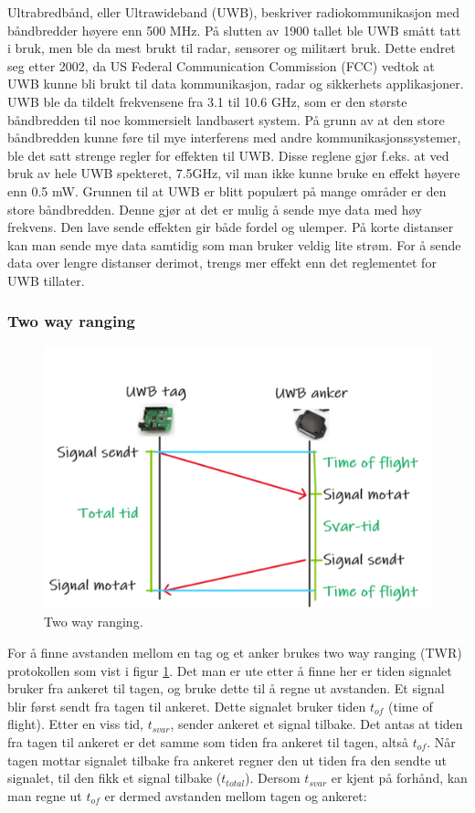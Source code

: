 Ultrabredbånd, eller Ultrawideband (UWB), beskriver radiokommunikasjon med båndbredder høyere enn 500 MHz. 
På slutten av 1900 tallet ble UWB smått tatt i bruk, men ble da mest brukt til radar, sensorer og militært bruk. 
Dette endret seg etter 2002, da US Federal Communication Commission (FCC) vedtok at UWB kunne bli brukt til data kommunikasjon, 
radar og sikkerhets applikasjoner. UWB ble da tildelt frekvensene fra 3.1 til 10.6 GHz, 
som er den største båndbredden til noe kommersielt landbasert system. 
På grunn av at den store båndbredden kunne føre til mye interferens med andre kommunikasjonssystemer, 
ble det satt strenge regler for effekten til UWB. Disse reglene gjør f.eks. at ved bruk av hele UWB spekteret, 7.5GHz, 
vil man ikke kunne bruke en effekt høyere enn 0.5 mW.
Grunnen til at UWB er blitt populært på mange områder er den store båndbredden. Denne gjør at det er mulig å sende mye data med høy frekvens. 
Den lave sende effekten gir både fordel og ulemper. På korte distanser kan man sende mye data samtidig som man bruker veldig lite strøm. 
For å sende data over lengre distanser derimot, trengs mer effekt enn det reglementet for UWB tillater.
\parencite{Mearian2019}

\subsubsection{Two way ranging}

\begin{figure}[htp]
    \centering
    \includegraphics[width=0.7\columnwidth]{figures/twr}
    \caption{Two way ranging.}
    \label{fig:twr}
\end{figure}

For å finne avstanden mellom en tag og et anker brukes two way ranging (TWR) protokollen som vist i figur \ref{fig:twr}. 
Det man er ute etter å finne her er tiden signalet bruker fra ankeret til tagen, og bruke dette til å regne ut avstanden.
Et signal blir først sendt fra tagen til ankeret. Dette signalet bruker tiden $t_{of}$ (time of flight). 
Etter en viss tid, $t_{svar}$, sender ankeret et signal tilbake. Det antas at tiden fra tagen til ankeret er det samme som tiden fra ankeret til tagen, 
altså $t_{of}$. Når tagen mottar signalet tilbake fra ankeret regner den ut tiden fra den sendte ut signalet, 
til den fikk et signal tilbake ($t_{total}$). Dersom $t_{svar}$ er kjent på forhånd, 
kan man regne ut $t_{of}$ er dermed avstanden mellom tagen og ankeret:

